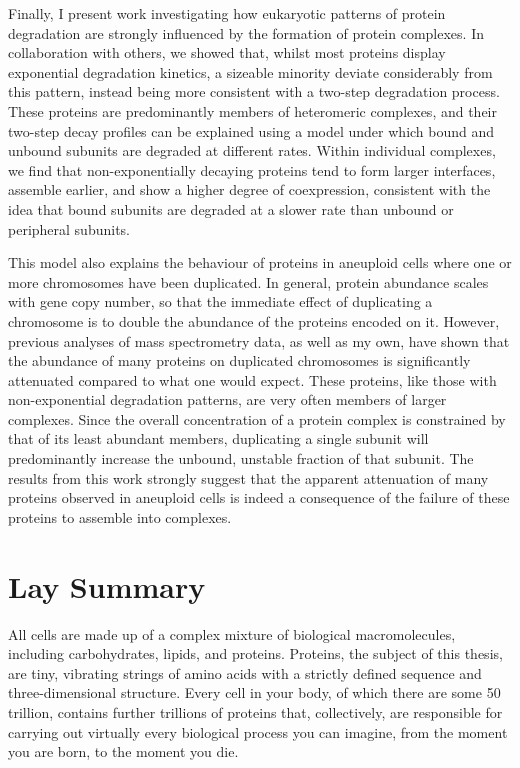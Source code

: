 \documentclass[a4paper,11pt,twoside,openright]{scrbook}
\begin{document}
Finally, I present work investigating how eukaryotic patterns of protein degradation are strongly influenced by the formation of protein complexes. In collaboration with others, we showed that, whilst most proteins display exponential degradation kinetics, a sizeable minority deviate considerably from this pattern, instead being more consistent with a two-step degradation process. These proteins are predominantly members of heteromeric complexes, and their two-step decay profiles can be explained using a model under which bound and unbound subunits are degraded at different rates. Within individual complexes, we find that non-exponentially decaying proteins tend to form larger interfaces, assemble earlier, and show a higher degree of coexpression, consistent with the idea that bound subunits are degraded at a slower rate than unbound or peripheral subunits.

This model also explains the behaviour of proteins in aneuploid cells where one or more chromosomes have been duplicated. In general, protein abundance scales with gene copy number, so that the immediate effect of duplicating a chromosome is to double the abundance of the proteins encoded on it. However, previous analyses of mass spectrometry data, as well as my own, have shown that the abundance of many proteins on duplicated chromosomes is significantly attenuated compared to what one would expect. These proteins, like those with non-exponential degradation patterns, are very often members of larger complexes. Since the overall concentration of a protein complex is constrained by that of its least abundant members, duplicating a single subunit will predominantly increase the unbound, unstable fraction of that subunit. The results from this work strongly suggest that the apparent attenuation of many proteins observed in aneuploid cells is indeed a consequence of the failure of these proteins to assemble into complexes.

\chapter*{Lay Summary}
All cells are made up of a complex mixture of biological macromolecules, including carbohydrates, lipids, and proteins. Proteins, the subject of this thesis, are tiny, vibrating strings of amino acids with a strictly defined sequence and three-dimensional structure. Every cell in your body, of which there are some 50 trillion, contains further trillions of proteins that, collectively, are responsible for carrying out virtually every biological process you can imagine, from the moment you are born, to the moment you die.
\end{document}
